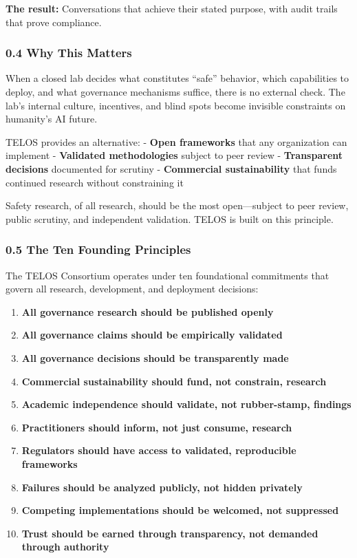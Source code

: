 \textbf{The result:} Conversations that achieve their stated purpose,
with audit trails that prove compliance.

\subsubsection{0.4 Why This Matters}\label{why-this-matters}

When a closed lab decides what constitutes ``safe'' behavior, which
capabilities to deploy, and what governance mechanisms suffice, there is
no external check. The lab's internal culture, incentives, and blind
spots become invisible constraints on humanity's AI future.

TELOS provides an alternative: - \textbf{Open frameworks} that any
organization can implement - \textbf{Validated methodologies} subject to
peer review - \textbf{Transparent decisions} documented for scrutiny -
\textbf{Commercial sustainability} that funds continued research without
constraining it

Safety research, of all research, should be the most open---subject to
peer review, public scrutiny, and independent validation. TELOS is built
on this principle.

\subsubsection{0.5 The Ten Founding
Principles}\label{the-ten-founding-principles}

The TELOS Consortium operates under ten foundational commitments that
govern all research, development, and deployment decisions:

\begin{enumerate}
\def\labelenumi{\arabic{enumi}.}
\tightlist
\item
  \textbf{All governance research should be published openly}
\item
  \textbf{All governance claims should be empirically validated}
\item
  \textbf{All governance decisions should be transparently made}
\item
  \textbf{Commercial sustainability should fund, not constrain,
  research}
\item
  \textbf{Academic independence should validate, not rubber-stamp,
  findings}
\item
  \textbf{Practitioners should inform, not just consume, research}
\item
  \textbf{Regulators should have access to validated, reproducible
  frameworks}
\item
  \textbf{Failures should be analyzed publicly, not hidden privately}
\item
  \textbf{Competing implementations should be welcomed, not suppressed}
\item
  \textbf{Trust should be earned through transparency, not demanded
  through authority}
\end{enumerate}

